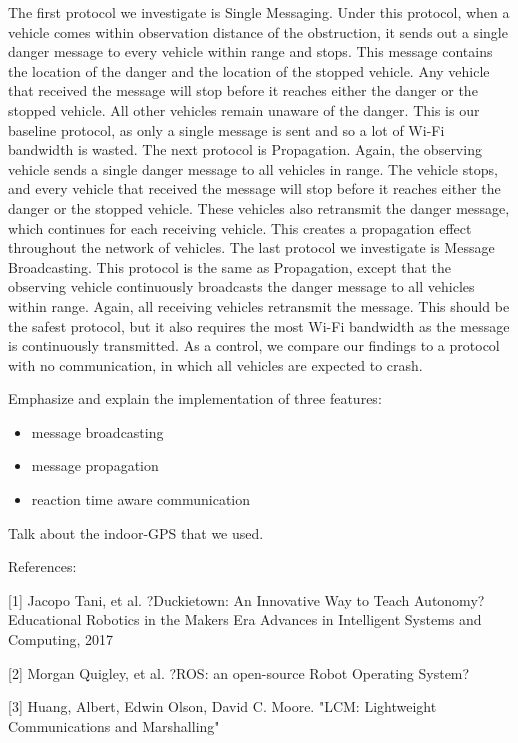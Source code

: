 The first protocol we investigate is Single Messaging. Under this protocol, when a vehicle comes within observation distance of the obstruction, it sends out a single danger message to every vehicle within range and stops. This message contains the location of the danger and the location of the stopped vehicle. Any vehicle that received the message will stop before it reaches either the danger or the stopped vehicle. All other vehicles remain unaware of the danger. This is our baseline protocol, as only a single message is sent and so a lot of Wi-Fi bandwidth is wasted. The next protocol is Propagation. Again, the observing vehicle sends a single danger message to all vehicles in range. The vehicle stops, and every vehicle that received the message will stop before it reaches either the danger or the stopped vehicle. These vehicles also retransmit the danger message, which continues for each receiving vehicle. This creates a propagation effect throughout the network of vehicles. The last protocol we investigate is Message Broadcasting. This protocol is the same as Propagation, except that the observing vehicle continuously broadcasts the danger message to all vehicles within range. Again, all receiving vehicles retransmit the message. This should be the safest protocol, but it also requires the most Wi-Fi bandwidth as the message is continuously transmitted. As a control, we compare our findings to a protocol with no communication, in which all vehicles are expected to crash.


Emphasize and explain the implementation of three features:
\begin{itemize}
\item message broadcasting
\item message propagation
\item reaction time aware communication
\end{itemize}

Talk about the indoor-GPS that we used.



References:

[1] Jacopo Tani, et al. ?Duckietown: An Innovative Way to Teach Autonomy? Educational Robotics in the Makers Era Advances in Intelligent Systems and Computing, 2017

[2] Morgan Quigley, et al. ?ROS: an open-source Robot Operating System? 

[3] Huang, Albert, Edwin Olson, David C. Moore. "LCM: Lightweight Communications and Marshalling" 